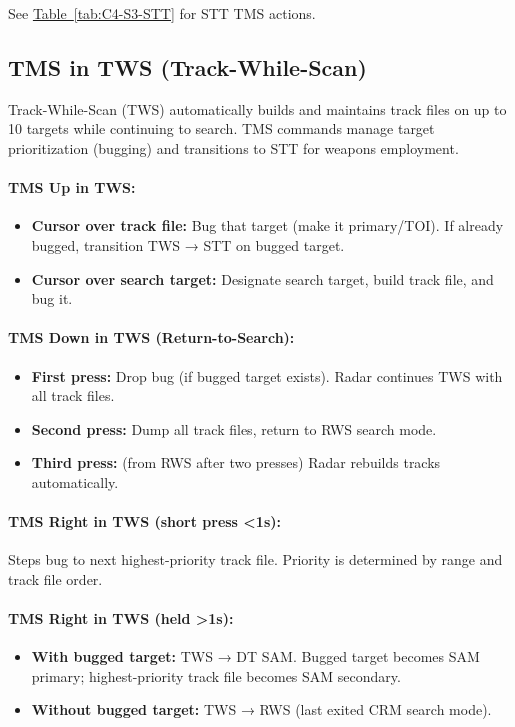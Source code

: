 \documentclass[11pt, a4paper, twoside]{report}
\newcommand{\tabref}[1]{\hyperref[#1]{Table~\ref*{#1}}}
\begin{document}
See \tabref{tab:C4-S3-STT} for STT TMS actions.

\subsection{TMS in TWS (Track-While-Scan)}
\label{sec:C4-S3-S3}

Track-While-Scan (TWS) automatically builds and maintains track files on up to 10 targets while continuing to search. TMS commands manage target prioritization (bugging) and transitions to STT for weapons employment.

\paragraph{TMS Up in TWS:}
\begin{itemize}
    \item \textbf{Cursor over track file:} Bug that target (make it primary/TOI). If already bugged, transition TWS → STT on bugged target.
    \item \textbf{Cursor over search target:} Designate search target, build track file, and bug it.
\end{itemize}

\paragraph{TMS Down in TWS (Return-to-Search):}
\begin{itemize}
    \item \textbf{First press:} Drop bug (if bugged target exists). Radar continues TWS with all track files.
    \item \textbf{Second press:} Dump all track files, return to RWS search mode.
    \item \textbf{Third press:} (from RWS after two presses) Radar rebuilds tracks automatically.
\end{itemize}

\paragraph{TMS Right in TWS (short press <1s):}
Steps bug to next highest-priority track file. Priority is determined by range and track file order.

\paragraph{TMS Right in TWS (held >1s):}
\begin{itemize}
    \item \textbf{With bugged target:} TWS → DT SAM. Bugged target becomes SAM primary; highest-priority track file becomes SAM secondary.
    \item \textbf{Without bugged target:} TWS → RWS (last exited CRM search mode).
\end{itemize}
\end{document}
